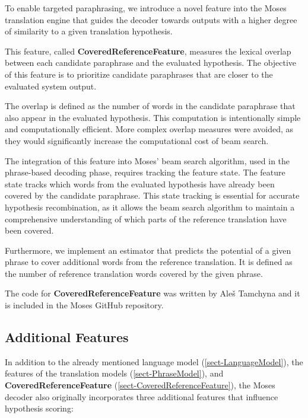 To enable targeted paraphrasing, we introduce a novel feature  into the Moses translation engine that guides the decoder towards outputs with a higher degree of similarity to a given translation hypothesis.

This feature, called \textbf{CoveredReferenceFeature}, measures the lexical overlap between each candidate paraphrase and the evaluated hypothesis. The objective of this feature is to prioritize candidate paraphrases that are closer to the evaluated system output. 

The overlap is defined as the number of words in the candidate paraphrase that also appear in the evaluated hypothesis. This computation is intentionally simple and computationally efficient. More complex overlap measures were avoided, as they would significantly increase the computational cost of beam search.

The integration of this feature into Moses' beam search algorithm, used in the phrase-based decoding phase, requires tracking the feature state. The feature state tracks which words from the evaluated hypothesis have already been covered by the candidate paraphrase. This state tracking is essential for accurate hypothesis recombination, as it allows the beam search algorithm to maintain a comprehensive understanding of which parts of the reference translation have been covered. 

Furthermore, we implement an estimator that predicts the potential of a given phrase to cover additional words from the reference translation. It is defined as the number of reference translation words covered by the given phrase. 

The code for \textbf{CoveredReferenceFeature} was written by Aleš Tamchyna and it is included in the Moses GitHub repository. 


\subsection{Additional Features}
\label{sect-OtherFeatures}
In addition to the already mentioned language model (\cref{sect-LanguageModel}), the features of the translation models (\cref{sect-PhraseModel}), and \textbf{CoveredReferenceFeature} (\cref{sect-CoveredReferenceFeature}), the Moses decoder also originally incorporates three additional features that influence hypothesis scoring:

